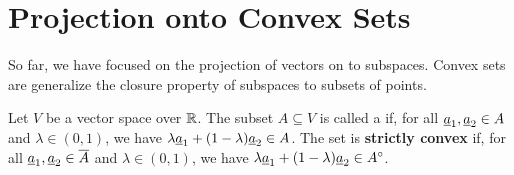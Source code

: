 \section{Projection onto Convex Sets}

So far, we have focused on the projection of vectors on to subspaces.
Convex sets are generalize the closure property of subspaces to subsets of points.

\begin{definition}
Let $V$ be a vector space over $\mathbb{R}$.
The subset $A \subseteq V$ is called a  if, for all $\underline{a}_1,\underline{a}_2 \in A$ and $\lambda\in(0,1)$, we have $\lambda \underline{a}_1 + (1-\lambda) \underline{a}_2 \in A$.
The set is \textbf{strictly convex} if, for all $\underline{a}_1,\underline{a}_2 \in \overline{A}$ and $\lambda\in(0,1)$, we have $\lambda \underline{a}_1 + (1-\lambda) \underline{a}_2 \in {A}^{\circ}$.
\end{definition}


